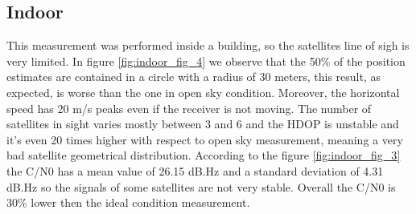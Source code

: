 \subsection{Indoor}
\label{sec:indoor}
This measurement was performed inside a building, so the satellites line of sigh is very limited. In figure \ref{fig:indoor_fig_4} we observe that the 50\% of the position estimates are contained in a circle with a radius of 30 meters, this result, as expected, is worse than the one in open sky condition. Moreover, the horizontal speed has 20 m/s peaks even if the receiver is not moving. The number of satellites in sight varies mostly between 3 and 6 and the HDOP is unstable and it's even 20 times higher with respect to open sky measurement, meaning a very bad satellite geometrical distribution. According to the figure \ref{fig:indoor_fig_3} the C/N0 has a mean value of 26.15 dB.Hz and a standard deviation of 4.31 dB.Hz so the signals of some satellites are not very stable. Overall the C/N0 is 30\% lower then the ideal condition measurement.

